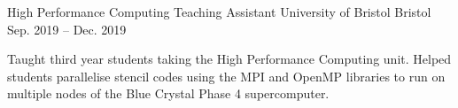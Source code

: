 \begin{cventries}
  \vspace{-0.2em}
  
  \cventry
    {High Performance Computing Teaching Assistant} %
    {University of Bristol} %
    {Bristol} %
    {Sep. 2019 -- Dec. 2019} %
    {
      \begin{cvitems} %
        \item {Taught third year students taking the High Performance Computing unit. Helped students parallelise stencil codes using the MPI and OpenMP libraries to run on multiple nodes of the Blue Crystal Phase 4 supercomputer.}
      \end{cvitems}
    }


\end{cventries}
